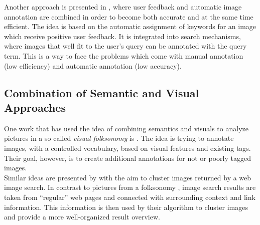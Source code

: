 \bigskip
Another approach is presented in \cite{wenyin2001semi}, where user feedback and automatic image annotation are combined in order to become both accurate and at the same time efficient. The idea is based on the automatic assignment of keywords for an image which receive positive user feedback. It is integrated into search mechanisms, where images that well fit to the user's query can be annotated with the query term. This is a way to face the problems which come with manual annotation (low efficiency) and automatic annotation (low accuracy).


\subsection{Combination of Semantic and Visual Approaches}

One work that has used the idea of combining semantics and visuals to analyze pictures in a so called \emph{visual folksonomy} is \cite{Lindstaedt2009}. The idea is trying to annotate images, with a controlled vocabulary, based on visual features and existing tags. Their goal, however, is to create additional annotations for not or poorly tagged images. \\
Similar ideas are presented by \cite{cai2004hierarchical} with the aim to cluster images returned by a web image search. In contrast to pictures from a folksonomy , image search results are taken from ``regular'' web pages and connected with surrounding context and link information. This information is then used by their algorithm to cluster images and provide a more well-organized result overview.
